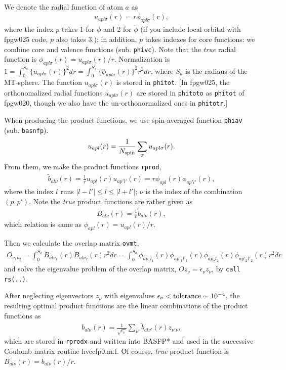 \documentclass[a4paper,10pt,epsf,fleqn]{article}
\begin{document}
We denote the radial function of atom $a$ as
\begin{eqnarray}
   u_{apl\sigma}(r) = r \phi_{apl\sigma}(r),
\end{eqnarray}
where the index $p$ takes 1 for $\phi$ and 2 for $\dot{\phi}$
(if you include local orbital with fpgw025 code, $p$ also takes 3.);
in addition, $p$ takes indexes for core functions:
we combine core and valence functions (sub. \verb|phivc|). 
Note that the \textit{true} radial function is
$\phi_{apl\sigma}(r) = u_{apl\sigma}(r)/r$.
Normalization is 
$1=\int_0^{S_a} \{ u_{apl\sigma}(r) \}^2 dr = 
   \int_0^{S_a} \{ \phi_{apl\sigma}(r) \}^2 r^2dr$,
where $S_a$ is the radiaus of the MT-sphere.
The function $u_{apl\sigma}(r)$ is stored in \verb#phitot#.
[In fpgw025, the orthonomalized radial functions $u_{apl\sigma}(r)$
are stored in \verb#phitoto# as \verb#phitot# of fpgw020,
though we also have the un-orthonormalized ones in \verb#phitotr#.]


When producing the product functions,
we use spin-averaged function \verb#phiav# (sub. \verb|basnfp|).
\begin{eqnarray}
   u_{apl}(r) = \frac{1}{N_{\rm spin}}\sum_{\sigma}
   u_{apl\sigma}(r).
\end{eqnarray}
From them, we make the product functions \verb#rprod#,
\begin{eqnarray}
  \tilde{b}_{al\nu}(r) = \frac{1}{r}{u_{a p l }(r) u_{a p' l'}(r)}
  = r \phi_{a p l}(r) \phi_{a p' l'}(r),
\end{eqnarray}
where the index $l$ runs $|l-l'| \le l \le |l+l'|$;
$\nu$ is the index of the combination $(p,p')$.
Note the {\it true} product functions are rather given as
\begin{eqnarray}
  \tilde{B}_{al\nu}(r) = \frac{1}{r}\tilde{b}_{al\nu}(r),
\end{eqnarray}
which relation is same as $\phi_{apl}(r)=u_{apl}(r)/r$.

Then we calculate the overlap matrix \verb#ovmt#,
\begin{eqnarray}
  O_{\nu_1\nu_2} = \int_0^{S_a} 
  \tilde{B}_{al\nu_1}(r) \tilde{B}_{al\nu_2}(r) r^2 dr
  = \int_0^{S_a}  \phi_{a p_1 l_1}(r) \phi_{a p'_1 l'_1}(r)
                  \phi_{a p_2 l_2}(r) \phi_{a p'_2 l'_2}(r) r^2 dr
\end{eqnarray}
and solve the eigenvalue problem of the overlap matrix,
$Oz_{\nu}=\epsilon_{\nu} z_{\nu}$, by \verb#call rs(..)#. 


After neglecting eigenvectors
$z_{\nu}$ with eigenvalues $\epsilon_{\nu} < {\rm tolerance} \sim 10^{-4}$, 
the resulting optimal product functions are the linear combinations 
of the product functions as
\begin{eqnarray}
   b_{al\nu}(r) = \frac{1}{\sqrt{\epsilon_{\nu}}}
   \sum_{\nu'}\tilde{b}_{al\nu'}(r)z_{\nu'\nu},
\end{eqnarray}
which are stored in \verb#rprodx# and written into {\sf BASFP*}
and used in the successive Coulomb matrix routine {\sf hvccfp0.m.f}.
Of course, \textit{true} product function is 
$B_{al\nu}(r) = b_{al\nu}(r)/r$.
\end{document}
